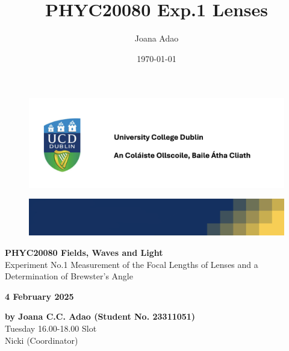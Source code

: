 \documentclass[12pt]{article}
\title{PHYC20080 Exp.1 Lenses}
\author{Joana Adao}
\date{\today}
\begin{document}
\begin{titlepage}
    \begin{center}

        \begin{figure}[ht]
            \includegraphics[width=\textwidth]{UCDLogo.png}
        \end{figure}
        
        \begin{figure}
            \centerline{\includegraphics[width=\paperwidth]{UCDBanner.png}}
        \end{figure}

        \vspace{4cm}

        {\LARGE \bfseries PHYC20080 Fields, Waves and Light}\\
        \vspace{0.75cm}
        {\Large Experiment No.1 Measurement of the Focal Lengths of Lenses and a Determination of Brewster's Angle}
        
        \vspace{1cm}
    
    {\Large \textbf{4 February 2025}}

    \vspace{2cm}
    
    {\large \textbf{by Joana C.C. Adao (Student No. 23311051)}}\\
    \vspace{0.25cm}
    {\large Tuesday 16.00-18.00 Slot}\\
    {\large Nicki (Coordinator)}

    \end{center}
    
   \clearpage

\end{titlepage}
\end{document}
